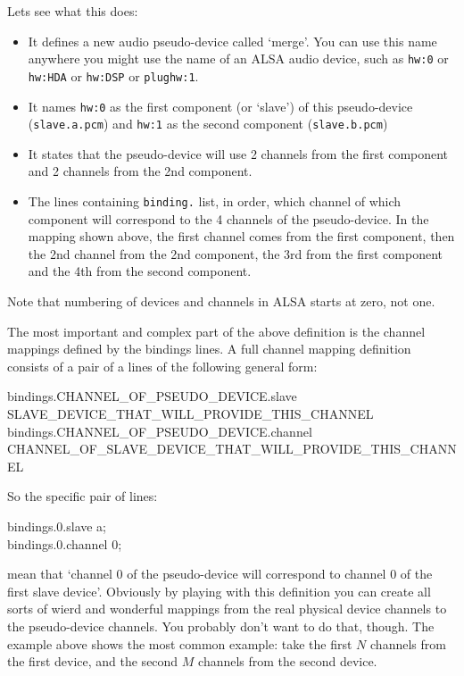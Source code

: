 \documentclass[10pt,a4paper]{book}
\begin{document}
\begin{enumerate}
\begin{itemize}
Lets see what this does:

\begin{itemize}

\item It defines a new audio pseudo-device called `merge'. You can use
  this name anywhere you might use the name of an ALSA audio device,
  such as \texttt{hw:0} or \texttt{hw:HDA} or \texttt{hw:DSP} or
  \texttt{plughw:1}.
\item It names \texttt{hw:0} as the first component (or `slave') of
  this pseudo-device (\texttt{slave.a.pcm}) and \texttt{hw:1} as the
  second component (\texttt{slave.b.pcm})
\item It states that the pseudo-device will use 2 channels from the
  first component and 2 channels from the 2nd component.
\item The lines containing \texttt{binding.} list, in order, which
  channel of which component will correspond to the 4 channels of the
  pseudo-device. In the mapping shown above, the first channel comes
  from the first component, then the 2nd channel from the 2nd
  component, the 3rd from the first component and the 4th from the
  second component.

\end{itemize}

Note that numbering of devices and channels in ALSA starts at zero,
not one.

The most important and complex part of the above definition is the
channel mappings defined by the bindings lines. A full channel mapping
definition consists of a pair of a lines of the following general
form:

\begin{listing}
bindings.CHANNEL\_OF\_PSEUDO\_DEVICE.slave SLAVE\_DEVICE\_THAT\_WILL\_PROVIDE\_THIS\_CHANNEL\\
bindings.CHANNEL\_OF\_PSEUDO\_DEVICE.channel CHANNEL\_OF\_SLAVE\_DEVICE\_THAT\_WILL\_PROVIDE\_THIS\_CHANNEL
\end{listing}

So the specific pair of lines:

\begin{listing}
bindings.0.slave a;\\
bindings.0.channel 0;
\end{listing}

mean that `channel 0 of the pseudo-device will correspond to channel 0
of the first slave device'. Obviously by playing with this definition
you can create all sorts of wierd and wonderful mappings from the real
physical device channels to the pseudo-device channels. You probably
don't want to do that, though. The example above shows the most common
example: take the first $N$ channels from the first device, and the
second $M$ channels from the second device.


\end{itemize}
\end{enumerate}
\end{document}
